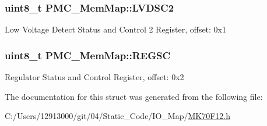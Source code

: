\subsubsection[{L\+V\+D\+S\+C2}]{\setlength{\rightskip}{0pt plus 5cm}uint8\+\_\+t P\+M\+C\+\_\+\+Mem\+Map\+::\+L\+V\+D\+S\+C2}\label{struct_p_m_c___mem_map_a934db8b39dae8b99a9a9165df50145f5}
Low Voltage Detect Status and Control 2 Register, offset\+: 0x1 \hypertarget{struct_p_m_c___mem_map_aa14a55a46cc237589d6c01ebf7676c2a}{}
\subsubsection[{R\+E\+G\+S\+C}]{\setlength{\rightskip}{0pt plus 5cm}uint8\+\_\+t P\+M\+C\+\_\+\+Mem\+Map\+::\+R\+E\+G\+S\+C}\label{struct_p_m_c___mem_map_aa14a55a46cc237589d6c01ebf7676c2a}
Regulator Status and Control Register, offset\+: 0x2 

The documentation for this struct was generated from the following file\+:\begin{DoxyCompactItemize}
\item 
C\+:/\+Users/12913000/git/04/\+Static\+\_\+\+Code/\+I\+O\+\_\+\+Map/\hyperlink{_m_k70_f12_8h}{M\+K70\+F12.\+h}\end{DoxyCompactItemize}
